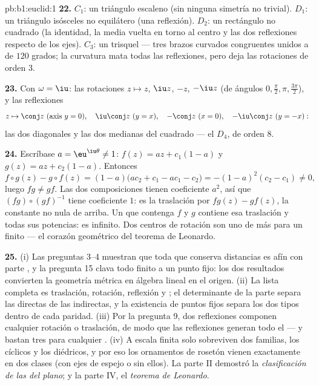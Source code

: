 \begin{solution}{pb:b1:euclid:1}
\textbf{22.} $C_1$: un triángulo escaleno (sin ninguna simetría no
trivial). $D_1$: un triángulo isósceles no equilátero (una
reflexión). $D_2$: un rectángulo no cuadrado (la identidad, la media
vuelta en torno al centro y las dos reflexiones respecto de los
ejes). $C_3$: un trisquel --- tres brazos curvados congruentes
unidos a  de $120$ grados; la curvatura mata todas las
reflexiones, pero deja las rotaciones de orden $3$.

\textbf{23.} Con $\omega = \iu$: las rotaciones $z \mapsto z$,
$\iu z$, $-z$, $-\iu z$ (de ángulos $0, \frac\pi2, \pi,
\frac{3\pi}2$), y las reflexiones
\[
z \mapsto \conj z \ (\text{axis } y = 0), \quad
\iu\conj z \ (y = x), \quad
-\conj z \ (x = 0), \quad
-\iu\conj z \ (y = -x):
\]
las dos diagonales y las dos medianas del cuadrado --- el
 $D_4$, de orden $8$.

\textbf{24.} Escríbase $a = \eu^{\iu\theta} \neq 1$:
$f(z) = az + c_1(1 - a)$ y $g(z) = az + c_2(1 - a)$. Entonces
\[
f\circ g(z) - g\circ f(z)
= (1-a)\bigl(ac_2 + c_1 - ac_1 - c_2\bigr)
= -(1 - a)^2(c_2 - c_1) \neq 0 ,
\]
luego $f g \neq g f$. Las dos composiciones tienen coeficiente
 $a^2$, así que $(fg)\circ(gf)^{-1}$ tiene coeficiente
 $1$: es la traslación por $fg(z) - gf(z)$, la constante no
nula de arriba. Un  que contenga $f$ y $g$ contiene esa
traslación y todas sus potencias: es infinito. Dos centros de
rotación son uno de más para un  finito --- el corazón
geométrico del teorema de Leonardo.

\textbf{25.} (i) Las preguntas 3--4 muestran que toda  que
conserva distancias es afín con parte  , y la
pregunta 15 clava todo  finito a un punto fijo: los dos
resultados convierten la geometría métrica en álgebra lineal en el
origen. (ii) La lista completa es traslación, rotación, reflexión y
; el determinante de la parte  separa las
directas de las indirectas, y la existencia de puntos fijos separa
los dos tipos dentro de cada paridad. (iii) Por la pregunta 9, dos
reflexiones componen cualquier rotación o traslación, de modo que las
reflexiones generan todo el  --- y bastan tres para cualquier
. (iv) A escala finita solo sobreviven dos familias, los
 cíclicos y los diédricos, y por eso los ornamentos de rosetón
vienen exactamente en dos clases (con ejes de espejo o sin ellos). La
parte II demostró la \emph{clasificación de las  del
plano}; y la parte IV, el \emph{teorema de Leonardo}.
\end{solution}
